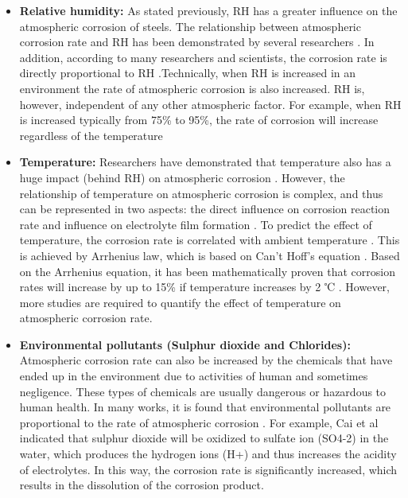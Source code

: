 \begin{itemize}
    \item \textbf{Relative humidity:} As stated previously, RH has a greater influence on the atmospheric corrosion of steels. The relationship between atmospheric corrosion rate and RH has been demonstrated by several researchers \cite{dong2005deformation, islam2018effects}. In addition, according to many researchers and scientists, the corrosion rate is directly proportional to RH \cite{dong2005deformation, islam2018effects}.Technically, when RH is increased in an environment the rate of atmospheric corrosion is also increased. RH is, however, independent of any other atmospheric factor. For example, when RH is increased typically from 75\% to 95\%, the rate of corrosion will increase regardless of the temperature \cite{sourmail2005stainless}
    
    \item \textbf{Temperature:}  Researchers have demonstrated that temperature also has a huge impact (behind RH) on atmospheric corrosion \cite{islam2018effects, cengel1998heat}. However, the relationship of temperature on atmospheric corrosion is complex, and thus can be represented in two aspects: the direct influence on corrosion reaction rate and influence on electrolyte film formation \cite{cai2018influence}. To predict the effect of temperature, the corrosion rate is correlated with ambient temperature \cite{pei2021understanding}.  This is achieved by Arrhenius law, which is based on Can't Hoff’s equation \cite{cai2018influence}. Based on the Arrhenius equation, it has been mathematically proven that corrosion rates will increase by up to 15\% if temperature increases by 2 ℃ \cite{mcarthur2004engineering}. However, more studies are required to quantify the effect of temperature on atmospheric corrosion rate.  
    
    \item \textbf{Environmental pollutants (Sulphur dioxide and Chlorides):} Atmospheric corrosion rate can also be increased by the chemicals that have ended up in the environment due to activities of human and sometimes negligence. These types of chemicals are usually dangerous or hazardous to human health. In many works, it is found that environmental pollutants are proportional to the rate of atmospheric corrosion \cite{soler2000metallic, dong2005deformation, islam2018effects}. For example, Cai et al \cite{cai2018influence} indicated that sulphur dioxide will be oxidized to sulfate ion (SO4-2) in the water, which produces the hydrogen ions (H+) and thus increases the acidity of electrolytes. In this way, the corrosion rate is significantly increased, which results in the dissolution of the corrosion product.
\end{itemize}
    
